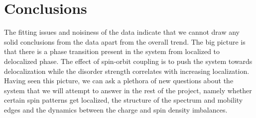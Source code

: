\documentclass[twocolumn]{article}
\begin{document}
\section{Conclusions}

The fitting issues and noisiness of the data indicate that
we cannot draw any solid conclusions from the data apart
from the overall trend. The big picture is that there is a
phase transition present in the system from localized to
delocalized phase. The effect of spin-orbit coupling is
to push the system towards delocalization while the disorder
strength correlates with increasing localization. Having seen
this picture, we can ask a plethora of new questions about
the system that we will attempt to answer in the rest of
the project, namely whether certain spin patterns get localized,
the structure of the spectrum and mobility edges and the dynamics
between the charge and spin density imbalances.


\printbibliography
\end{document}
